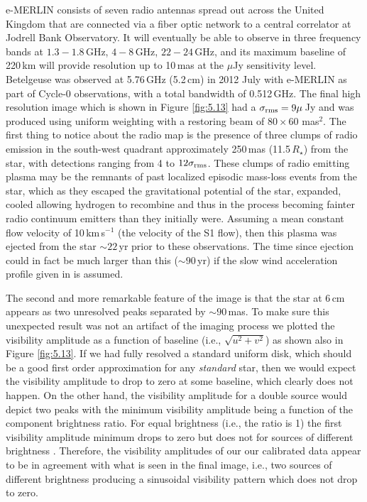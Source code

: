 e-MERLIN \citep{muxlow_2003} consists of seven radio antennas spread out across the United Kingdom that are connected via a fiber optic network to a central correlator at Jodrell Bank Observatory. It will eventually be able to observe in three frequency bands at $1.3-1.8$\,GHz, $4-8$\,GHz, $22-24$\,GHz, and its maximum baseline of 220\,km will provide resolution up to 10\,mas at the $\mu$Jy sensitivity level. Betelgeuse was observed at 5.76\,GHz (5.2\,cm) in 2012 July with e-MERLIN as part of Cycle-0 observations, with a total bandwidth of 0.512\,GHz. The final high resolution image which is shown in Figure \ref{fig:5.13} had a $\sigma _{\rm{rms}}=9\mu$\,Jy and was produced using uniform weighting with a restoring beam of $80\times 60$ mas$^2$. The first thing to notice about the radio map is the presence of three clumps of radio emission in the south-west quadrant approximately 250\,mas (11.5\,$R_{\star}$) from the star, with detections ranging from 4 to $12\sigma _{\rm{rms}}$. These clumps of radio emitting plasma may be the remnants of past localized episodic mass-loss events from the star, which as they escaped the gravitational potential of the star, expanded, cooled allowing hydrogen to recombine and thus in the process becoming fainter radio continuum emitters than they initially were. Assuming a mean constant flow velocity of 10\,km\,s$^{-1}$ (the velocity of the S1 flow), then this plasma was ejected from the star $\sim 22$\,yr prior to these observations. The time since ejection could in fact be much larger than this ($\sim 90$\,yr) if the slow wind acceleration profile given in \cite{harper_2001} is assumed.

The second and more remarkable feature of the image is that the star at 6\,cm appears as two unresolved peaks separated by $\sim 90$\,mas. To make sure this unexpected result was not an artifact of the imaging process we plotted the visibility amplitude as a function of baseline (i.e., $\sqrt{u^2 + v^2}$) as shown also in Figure \ref{fig:5.13}. If we had fully resolved a standard uniform disk, which should be a good first order approximation for any \textit{standard} star, then we would expect the visibility amplitude to drop to zero at some baseline, which clearly does not happen. On the other hand, the visibility amplitude for a double source would depict two peaks with the minimum visibility amplitude being a function of the component brightness ratio. For equal brightness (i.e., the ratio is 1) the first visibility amplitude minimum drops to zero but does not for sources of different brightness \citep{saha_2011}. Therefore, the visibility amplitudes of our our calibrated data appear to be in agreement with what is seen in the final image, i.e., two sources of different brightness producing a sinusoidal visibility pattern which does not drop to zero. 

